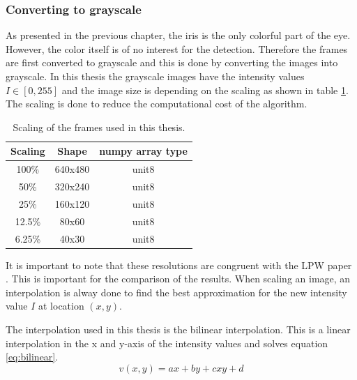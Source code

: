 \subsubsection{Converting to grayscale}
As presented in the previous chapter, the iris is the only colorful part of the eye. However, the color itself is of no interest for the detection. Therefore the frames are first converted to grayscale and this is done by converting the images into grayscale. 
In this thesis the grayscale images have the intensity values $I \in [0,255]$ and the image size is depending on the scaling as shown in table \ref{tab:resoluiton}. The scaling is done to reduce the computational cost of the algorithm. 

\begin{table}[h]
    \centering 
    \begin{minipage}{0.7\textwidth}
      \centering
      \begin{tabular}{|c|c|c|}
        \hline
        Scaling &  Shape & numpy array type \\
        \hline
        100\% & 640x480& unit8 \\
        50\% & 320x240 & unit8 \\
        25\% & 160x120 & unit8 \\
        12.5\% & 80x60 & unit8 \\
        6.25\% & 40x30 & unit8 \\
        \hline
      \end{tabular}
      \caption{Scaling of the frames used in this thesis.}
      \label{tab:resoluiton}
    \end{minipage}\hfill
\end{table}

It is important to note that these resolutions are congruent with the LPW paper \cite{zhang_max-planck-institut_nodate}. This is important for the comparison of the results.
When scaling an image, an interpolation is alway done to find the best approximation for the new intensity value $I$ at location $(x,y)$. 

The interpolation used in this thesis is the bilinear interpolation\cite{gonzalez_bilinear_nodate}. This is a linear interpolation in the x and y-axis of the intensity values and solves equation \ref{eq:bilinear}.
\begin{equation}
    v(x,y) = ax + by + cxy + d 
    \label{eq:bilinear}
\end{equation}

